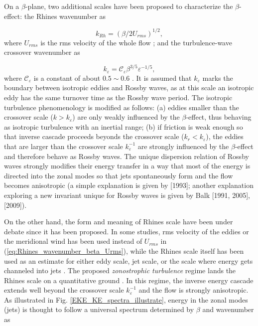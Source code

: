 \documentclass{ametsoc}
\begin{document}
On a $\beta$-plane, two additional scales have been proposed to characterize
the $\beta$-effect: the Rhines wavenumber as

\begin{equation}
k_{Rh}=(\beta/2U_{rms})^{1/2},\label{eq:Rhines_wavenumber_beta_Urms}
\end{equation}
where $U_{rms}$ is the rms velocity of the whole flow \citep{Rhines1975};
and the turbulence-wave crossover wavenumber as

\begin{equation}
k_{\varepsilon}=\mathcal{\mathcal{C}_{\varepsilon}}\beta^{3/5}\varepsilon^{-1/5},\label{eq:classical_crossover_wavenumber}
\end{equation}
where $\mathcal{\mathcal{C}_{\varepsilon}}$ is a constant of about
$0.5\sim0.6$ \citep{Vallis1993,Galperin2010,Smith2002}. It is assumed
that $k_{\varepsilon}$ marks the boundary between isotropic eddies
and Rossby waves, as at this scale an isotropic eddy has the same turnover time as the Rossby wave period. The
isotropic turbulence phenomenology is modified as follows: (a)
eddies smaller than the crossover scale ($k>k_{\varepsilon}$) are
only weakly influenced by the $\beta$-effect, thus behaving as isotropic
turbulence with an inertial range; (b) if friction is weak enough
so that inverse cascade proceeds beyonds the crossover scale ($k_{r}<k_{\varepsilon}$),
the eddies that are larger than the crossover scale $k_{\varepsilon}^{-1}$
are strongly influenced by the $\beta$-effect and therefore behave
as Rossby waves. The unique dispersion relation of Rossby waves strongly
modifies their energy transfer in a way that most of the energy is
directed into the zonal modes so that jets spontaneously form and
the flow becomes anisotropic (a simple explanation is given by \citeauthor{Vallis1993}
{[}1993{]}; another explanation exploring a new invariant unique for
Rossby waves is given by \nocite{Balk1991,Balk2005}Balk {[}1991,
2005{]}, \citeauthor{Nazarenko2009} {[}2009{]}). 

On the other hand, the form and meaning of Rhines scale have been
under debate since it has been proposed. In some studies, rms velocity
of the eddies or the meridional wind has been used instead of $U_{rms}$
in (\ref{eq:Rhines_wavenumber_beta_Urms}), while the Rhines scale itself
has been used as an estimate for either eddy scale, jet scale, or
the scale where energy gets channeled into jets \citep{Williams1978,Jansen2012,Chai2014,Liu2015,Chemke2015}.
The proposed \textit{zonostrophic turbulence} regime lands the Rhines
scale on a quantitative ground \citep{Sukoriansky2002,Galperin2010}.
In this regime, the inverse energy cascade extends well beyond the
crossover scale $k_{\varepsilon}^{-1}$ and the flow is strongly anisotropic.
As illustrated in Fig. \ref{EKE_KE_spectra_illustrate}, energy in
the zonal modes (jets) is thought to follow a universal spectrum determined
by $\beta$ and wavenumber as
\end{document}
